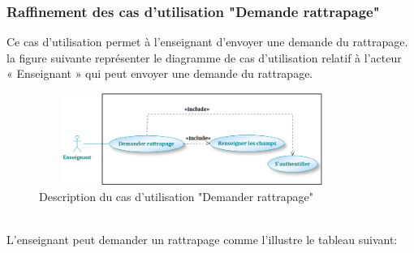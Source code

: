 \documentclass[12 pt]{report}
\begin{document}
\subsubsection{Raffinement des cas d’utilisation "Demande rattrapage"}
Ce cas d'utilisation permet à l'enseignant d'envoyer une demande du rattrapage.\\
la figure suivante représenter le diagramme de cas d’utilisation  relatif à l’acteur \\« Enseignant » qui peut envoyer une demande du rattrapage.
\begin{figure}[h]
\begin{center}
\includegraphics[width= 10cm , height = 3cm]{enseignant1.png}
\caption{Description du cas d'utilisation "Demander rattrapage"}
\end{center}
\end{figure}
\\
L'enseignant peut demander un rattrapage comme l’illustre le tableau suivant:
\end{document}

